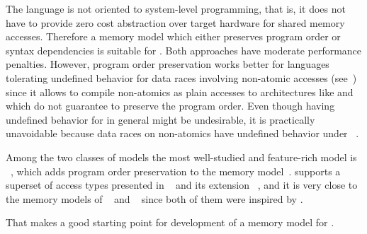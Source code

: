 The language is not oriented to system-level programming,
that is, it does not have to provide zero cost abstraction over target hardware
for shared memory accesses.
Therefore a memory model which either preserves program order 
or syntax dependencies is suitable for \Kotlin.
Both approaches have moderate performance penalties.
However, program order preservation works better for languages tolerating undefined behavior
for data races involving non-atomic accesses (see~\cite{Ou-Demsky:OOPSLA18})
since it allows to compile non-atomics as plain accesses to architectures like \ARM and \POWER
which do not guarantee to preserve the program order. 
Even though having undefined behavior for \Kotlin in general might be undesirable,
it is practically unavoidable because data races on non-atomics have undefined
behavior under \LLVM~\cite{Chakraborty-Vafeiadis:CGO17}.

Among the two classes of models the most well-studied and feature-rich model is
\RCMM~\cite{Lahav-al:PLDI17}, which adds program order preservation 
to the \CMM memory model~\cite{Batty-al:POPL11}.
\RCMM supports a superset of access types presented in \JMM~\cite{Manson-al:POPL05}
and its extension \JAM~\cite{Bender-Palsberg:OOPSLA19}, 
and it is very close to the memory models of \JS~\cite{Watt-al:PLDI2020} 
and \LLVM~\cite{Chakraborty-Vafeiadis:CGO17} since both of them were inspired by \CMM. 

That makes \RCMM a good starting point for development of a memory model for \Kotlin.
